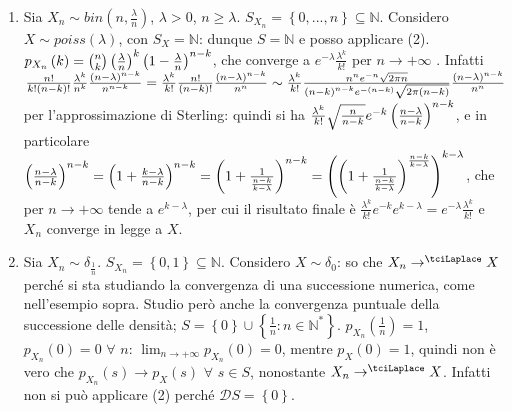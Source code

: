 \documentclass{article}
\begin{document}
\begin{enumerate}
\item Sia $X_{n}\sim bin\left( n,\frac{\lambda }{n}\right) $, $\lambda >0$, $%
n\geq \lambda $. $S_{X_{n}}=\left\{ 0,...,n\right\} \subseteq 
\mathbb{N}
$. Considero $X\sim poiss\left( \lambda \right) $, con $S_{X}=%
\mathbb{N}
$: dunque $S=%
\mathbb{N}
$ e posso applicare (2). $p_{X_{n}}\left( k\right) =\binom{n}{k}\left( \frac{%
\lambda }{n}\right) ^{k}\left( 1-\frac{\lambda }{n}\right) ^{n-k}$, che
converge a $e^{-\lambda }\frac{\lambda ^{k}}{k!}$ per $n\rightarrow +\infty $%
. Infatti $\frac{n!}{k!\left( n-k\right) !}\frac{\lambda ^{k}}{n^{k}}\frac{%
\left( n-\lambda \right) ^{n-k}}{n^{n-k}}=\frac{\lambda ^{k}}{k!}\frac{n!}{%
\left( n-k\right) !}\frac{\left( n-\lambda \right) ^{n-k}}{n^{n}}\sim \frac{%
\lambda ^{k}}{k!}\frac{n^{n}e^{-n}\sqrt{2\pi n}}{\left( n-k\right)
^{n-k}e^{-\left( n-k\right) }\sqrt{2\pi \left( n-k\right) }}\frac{\left(
n-\lambda \right) ^{n-k}}{n^{n}}$ per l'approssimazione di Sterling: quindi
si ha $\frac{\lambda ^{k}}{k!}\sqrt{\frac{n}{n-k}}e^{-k}\left( \frac{%
n-\lambda }{n-k}\right) ^{n-k}$, e in particolare $\left( \frac{n-\lambda }{%
n-k}\right) ^{n-k}=\left( 1+\frac{k-\lambda }{n-k}\right) ^{n-k}=\left( 1+%
\frac{1}{\frac{n-k}{k-\lambda }}\right) ^{n-k}=\left( \left( 1+\frac{1}{%
\frac{n-k}{k-\lambda }}\right) ^{\frac{n-k}{k-\lambda }}\right) ^{k-\lambda
} $, che per $n\rightarrow +\infty $ tende a $e^{k-\lambda }$, per cui il
risultato finale \`{e} $\frac{\lambda ^{k}}{k!}e^{-k}e^{k-\lambda
}=e^{-\lambda }\frac{\lambda ^{k}}{k!}$ e $X_{n}$ converge in legge a $X$.

\item Sia $X_{n}\sim \delta _{\frac{1}{n}}$. $S_{X_{n}}=\left\{ 0,1\right\}
\subseteq 
\mathbb{N}
$. Considero $X\sim \delta _{0}$: so che $X_{n}\rightarrow ^{\tciLaplace }X$
perch\'{e} si sta studiando la convergenza di una successione numerica, come
nell'esempio sopra. Studio per\`{o} anche la convergenza puntuale della
successione delle densit\`{a}; $S=\left\{ 0\right\} \cup \left\{ \frac{1}{n}%
:n\in 
\mathbb{N}
^{\ast }\right\} $. $p_{X_{n}}\left( \frac{1}{n}\right) =1$, $%
p_{X_{n}}\left( 0\right) =0$ $\forall $ $n$: $\lim_{n\rightarrow +\infty
}p_{X_{n}}\left( 0\right) =0$, mentre $p_{X}\left( 0\right) =1$, quindi non 
\`{e} vero che $p_{X_{n}}\left( s\right) \rightarrow p_{X}\left( s\right) $ $%
\forall $ $s\in S$, nonostante $X_{n}\rightarrow ^{\tciLaplace }X$. Infatti
non si pu\`{o} applicare (2) perch\'{e} $\mathcal{D}S=\left\{ 0\right\} $.
\end{enumerate}
\end{document}

